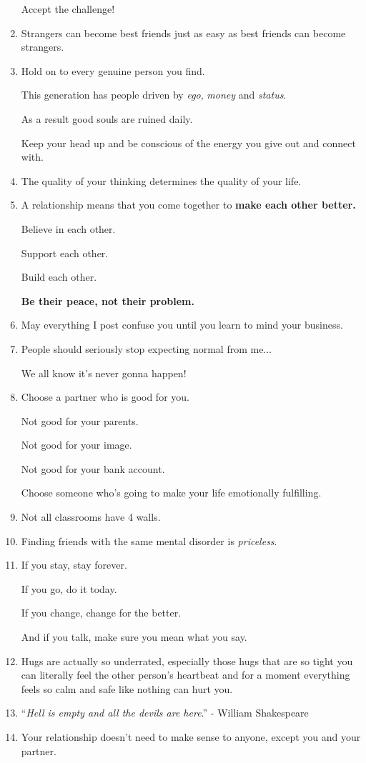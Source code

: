 \documentclass{article}
\begin{document}
\begin{enumerate}
	Accept the challenge!
	\item Strangers can become best friends just as easy as best friends can become strangers.
	\item Hold on to every genuine person you find.
	
	This generation has people driven by \textit{ego}, \textit{money} and \textit{status}.
	
	As a result good souls are ruined daily.
	
	Keep your head up and be conscious of the energy you give out and connect with.
	\item The quality of your thinking determines the quality of your life.
	\item A relationship means that you come together to \textbf{make each other better.}
	
	Believe in each other.
	
	Support each other.
	
	Build each other.
	
	\textbf{Be their peace, not their problem.}
	\item May everything I post confuse you until you learn to mind your business.
	\item People should seriously stop expecting normal from me$\ldots$
	
	We all know it's never gonna happen!
	\item Choose a partner who is good for you.
	
	Not good for your parents.
	
	Not good for your image.
	
	Not good for your bank account.
	
	Choose someone who's going to make your life emotionally fulfilling.
	\item Not all classrooms have 4 walls.
	\item Finding friends with the same mental disorder is \textit{priceless}.
	\item If you stay, stay forever.
	
	If you go, do it today.
	
	If you change, change for the better.
	
	And if you talk, make sure you mean what you say.
	\item Hugs are actually so underrated, especially those hugs that are so tight you can literally feel the other person's heartbeat and for a moment everything feels so calm and safe like nothing can hurt you.
	\item ``\textit{Hell is empty and all the devils are here}.'' - William Shakespeare
	\item Your relationship doesn't need to make sense to anyone, except you and your partner.
	

\end{enumerate}
\end{document}
